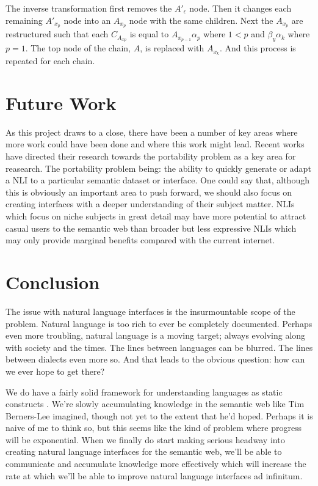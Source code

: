 \documentclass[11pt]{article}
\begin{document}
The inverse transformation first removes the $A'_\epsilon$ node. Then it changes each remaining $A'_{x_p}$ node into an $A_{x_p}$ node
with the same children. Next the $A_{x_p}$ are restructured such that each $C_{A_{x p}}$
is equal to $A_{x_{p-1}} \alpha_p$ where $1 < p$ and $\beta_y \alpha_k$ where $p=1$. The top node of the chain, 
$A$, is replaced with $A_{x_k}$. And this process is repeated for each chain.

\section{Future Work}
As this project draws to a close, there have been a number of key areas where more work
could have been done and where this work might lead. 
Recent works have directed their research towards the portability problem as a key area 
for reasearch. The portability problem being: the ability to quickly generate or adapt 
a NLI to a particular semantic dataset or interface. 
One could say that, although this is obviously
an important area to push forward, we should also focus on creating interfaces with a
deeper understanding of their subject matter. NLIs which focus on niche subjects in great
detail may have more potential to attract casual users to the semantic web than broader
but less expressive NLIs which may only provide marginal benefits compared with the 
current internet.

\section{Conclusion}
The issue with natural language interfaces is the insurmountable scope of the problem. 
Natural language is too rich to ever be completely documented. Perhaps even more troubling,
natural language is a moving target; always evolving along with society and the times.
The lines between languages can be blurred. The lines between dialects even more so.
And that leads to the obvious question: how can we ever hope to get there?

We do have a fairly solid framework for understanding languages as static constructs
\cite{chomsky}. We're slowly accumulating knowledge in the semantic web like 
Tim Berners-Lee imagined, though not yet to the extent that he'd hoped. Perhaps it is
naive of me to think so, but this seems like the kind of problem where progress
will be exponential. When we finally do start making serious headway into creating
natural language interfaces for the semantic web, we'll be able to communicate and
accumulate knowledge more effectively which will increase the rate at which we'll be
able to improve natural language interfaces ad infinitum.
\end{document}
